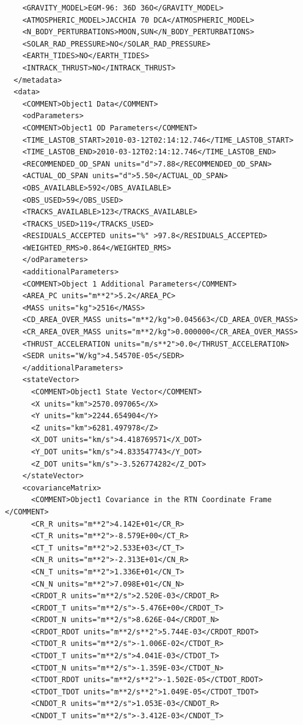 \begin{lstlisting}
    <GRAVITY_MODEL>EGM-96: 36D 36O</GRAVITY_MODEL>
    <ATMOSPHERIC_MODEL>JACCHIA 70 DCA</ATMOSPHERIC_MODEL>
    <N_BODY_PERTURBATIONS>MOON,SUN</N_BODY_PERTURBATIONS>
    <SOLAR_RAD_PRESSURE>NO</SOLAR_RAD_PRESSURE>
    <EARTH_TIDES>NO</EARTH_TIDES>
    <INTRACK_THRUST>NO</INTRACK_THRUST>
  </metadata>
  <data>
    <COMMENT>Object1 Data</COMMENT>
    <odParameters>
    <COMMENT>Object1 OD Parameters</COMMENT>
    <TIME_LASTOB_START>2010-03-12T02:14:12.746</TIME_LASTOB_START>
    <TIME_LASTOB_END>2010-03-12T02:14:12.746</TIME_LASTOB_END>
    <RECOMMENDED_OD_SPAN units="d">7.88</RECOMMENDED_OD_SPAN>
    <ACTUAL_OD_SPAN units="d">5.50</ACTUAL_OD_SPAN>
    <OBS_AVAILABLE>592</OBS_AVAILABLE>
    <OBS_USED>59</OBS_USED>
    <TRACKS_AVAILABLE>123</TRACKS_AVAILABLE>
    <TRACKS_USED>119</TRACKS_USED>
    <RESIDUALS_ACCEPTED units="%" >97.8</RESIDUALS_ACCEPTED>
    <WEIGHTED_RMS>0.864</WEIGHTED_RMS>
    </odParameters>
    <additionalParameters>
    <COMMENT>Object 1 Additional Parameters</COMMENT>
    <AREA_PC units="m**2">5.2</AREA_PC>
    <MASS units="kg">2516</MASS>
    <CD_AREA_OVER_MASS units="m**2/kg">0.045663</CD_AREA_OVER_MASS>
    <CR_AREA_OVER_MASS units="m**2/kg">0.000000</CR_AREA_OVER_MASS>
    <THRUST_ACCELERATION units="m/s**2">0.0</THRUST_ACCELERATION>
    <SEDR units="W/kg">4.54570E-05</SEDR>
    </additionalParameters>
    <stateVector>
      <COMMENT>Object1 State Vector</COMMENT>
      <X units="km">2570.097065</X>
      <Y units="km">2244.654904</Y>
      <Z units="km">6281.497978</Z>
      <X_DOT units="km/s">4.418769571</X_DOT>
      <Y_DOT units="km/s">4.833547743</Y_DOT>
      <Z_DOT units="km/s">-3.526774282</Z_DOT>
    </stateVector>
    <covarianceMatrix>
      <COMMENT>Object1 Covariance in the RTN Coordinate Frame </COMMENT>
      <CR_R units="m**2">4.142E+01</CR_R>
      <CT_R units="m**2">-8.579E+00</CT_R>
      <CT_T units="m**2">2.533E+03</CT_T>
      <CN_R units="m**2">-2.313E+01</CN_R>
      <CN_T units="m**2">1.336E+01</CN_T>
      <CN_N units="m**2">7.098E+01</CN_N>
      <CRDOT_R units="m**2/s">2.520E-03</CRDOT_R>
      <CRDOT_T units="m**2/s">-5.476E+00</CRDOT_T>
      <CRDOT_N units="m**2/s">8.626E-04</CRDOT_N>
      <CRDOT_RDOT units="m**2/s**2">5.744E-03</CRDOT_RDOT>
      <CTDOT_R units="m**2/s">-1.006E-02</CTDOT_R>
      <CTDOT_T units="m**2/s">4.041E-03</CTDOT_T>
      <CTDOT_N units="m**2/s">-1.359E-03</CTDOT_N>
      <CTDOT_RDOT units="m**2/s**2">-1.502E-05</CTDOT_RDOT>
      <CTDOT_TDOT units="m**2/s**2">1.049E-05</CTDOT_TDOT>
      <CNDOT_R units="m**2/s">1.053E-03</CNDOT_R>
      <CNDOT_T units="m**2/s">-3.412E-03</CNDOT_T>

\end{lstlisting}
